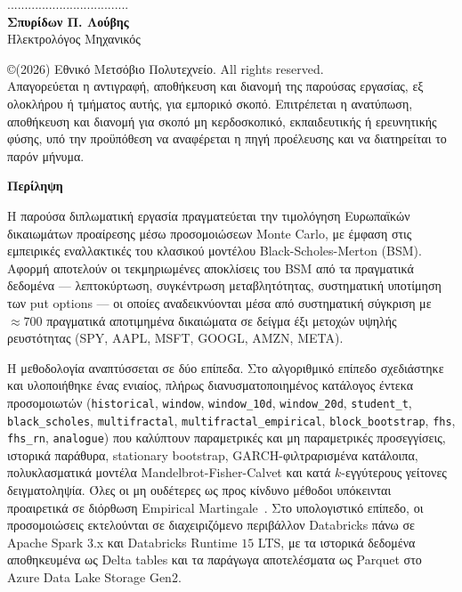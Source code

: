 \documentclass[12pt]{article}
\begin{document}
\hspace{10pt}
\vspace{10ex}
\noindent
................................... \\
\textbf{Σπυρίδων Π. Λούβης} \\
Ηλεκτρολόγος Μηχανικός \\
\vspace{8ex}

\small
\noindent
\copyright \hspace{1em}(2026) Εθνικό Μετσόβιο Πολυτεχνείο. All rights reserved.\\
\noindent
Απαγορεύεται η αντιγραφή, αποθήκευση και διανομή της παρούσας εργασίας, εξ ολοκλήρου ή τμήματος αυτής, για εμπορικό σκοπό. Επιτρέπεται η ανατύπωση, αποθήκευση και διανομή για σκοπό μη κερδοσκοπικό, εκπαιδευτικής ή ερευνητικής φύσης, υπό την προϋπόθεση να αναφέρεται η πηγή προέλευσης και να διατηρείται το παρόν μήνυμα.

\newpage

\begin{center}
\begin{large}\textbf{Περίληψη}\end{large}
\end{center}

Η παρούσα διπλωματική εργασία πραγματεύεται την τιμολόγηση Ευρωπαϊκών δικαιωμάτων προαίρεσης μέσω προσομοιώσεων Monte Carlo, με έμφαση στις εμπειρικές εναλλακτικές του κλασικού μοντέλου Black-Scholes-Merton (BSM). Αφορμή αποτελούν οι τεκμηριωμένες αποκλίσεις του BSM από τα πραγματικά δεδομένα — λεπτοκύρτωση, συγκέντρωση μεταβλητότητας, συστηματική υποτίμηση των put options — οι οποίες αναδεικνύονται μέσα από συστηματική σύγκριση με $\approx 700$ πραγματικά αποτιμημένα δικαιώματα σε δείγμα έξι μετοχών υψηλής ρευστότητας (SPY, AAPL, MSFT, GOOGL, AMZN, META).

Η μεθοδολογία αναπτύσσεται σε δύο επίπεδα. Στο αλγοριθμικό επίπεδο σχεδιάστηκε και υλοποιήθηκε ένας ενιαίος, πλήρως διανυσματοποιημένος κατάλογος έντεκα προσομοιωτών (\texttt{historical}, \texttt{window}, \texttt{window\_10d}, \texttt{window\_20d}, \texttt{student\_t}, \texttt{black\_scholes}, \texttt{multifractal}, \texttt{multifractal\_empirical}, \texttt{block\_bootstrap}, \texttt{fhs}, \texttt{fhs\_rn}, \texttt{analogue}) που καλύπτουν παραμετρικές και μη παραμετρικές προσεγγίσεις, ιστορικά παράθυρα, stationary bootstrap, GARCH-φιλτραρισμένα κατάλοιπα, πολυκλασματικά μοντέλα Mandelbrot-Fisher-Calvet και κατά $k$-εγγύτερους γείτονες δειγματοληψία. Όλες οι μη ουδέτερες ως προς κίνδυνο μέθοδοι υπόκεινται προαιρετικά σε διόρθωση Empirical Martingale~\cite{DuanSimonato1998}. Στο υπολογιστικό επίπεδο, οι προσομοιώσεις εκτελούνται σε διαχειριζόμενο περιβάλλον Databricks πάνω σε Apache Spark $3$.x και Databricks Runtime $15$ LTS, με τα ιστορικά δεδομένα αποθηκευμένα ως Delta tables και τα παράγωγα αποτελέσματα ως Parquet στο Azure Data Lake Storage Gen2.
\end{document}
